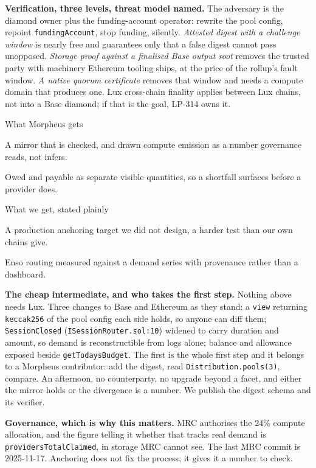 \documentclass[10pt,a4paper]{article}
\newcommand{\code}[1]{\texttt{\small #1}}
\begin{document}
\vspace{0.35ex}
\noindent\textbf{Verification, three levels, threat model named.}
The adversary is the diamond owner plus the funding-account operator: rewrite the pool config,
repoint \code{fundingAccount}, stop funding, silently. \emph{Attested digest with a challenge window}
is nearly free and guarantees only that a false digest cannot pass unopposed. \emph{Storage proof
against a finalised Base output root} removes the trusted party with machinery Ethereum tooling
ships, at the price of the rollup's fault window. \emph{A native quorum certificate} removes that
window and needs a compute domain that produces one. Lux cross-chain finality applies between Lux
chains, not into a Base diamond; if that is the goal, LP-314 owns it.

\begin{stake}{What Morpheus gets}
\item A mirror that is checked, and drawn compute emission as a number governance reads, not infers.
\item Owed and payable as separate visible quantities, so a shortfall surfaces before a provider does.
\end{stake}

\begin{stake}{What we get, stated plainly}
\item A production anchoring target we did not design, a harder test than our own chains give.
\item Enso routing measured against a demand series with provenance rather than a dashboard.
\end{stake}

\noindent\textbf{The cheap intermediate, and who takes the first step.}
Nothing above needs Lux. Three changes to Base and Ethereum as they stand: a \code{view} returning
\code{keccak256} of the pool config each side holds, so anyone can diff them;
\code{SessionClosed} (\code{ISessionRouter.sol:10}) widened to carry duration and amount, so demand is
reconstructible from logs alone; balance and allowance exposed beside \code{getTodaysBudget}. The
first is the whole first step and it belongs to a Morpheus contributor: add the digest, read
\code{Distribution.pools(3)}, compare. An afternoon, no counterparty, no upgrade beyond a facet, and
either the mirror holds or the divergence is a number. We publish the digest schema and its verifier.

\vspace{0.35ex}
\noindent\textbf{Governance, which is why this matters.}
MRC authorises the 24\% compute allocation, and the figure telling it whether that tracks real demand
is \code{providersTotalClaimed}, in storage MRC cannot see. The last MRC commit is 2025-11-17.
Anchoring does not fix the process; it gives it a number to check.
\end{document}
